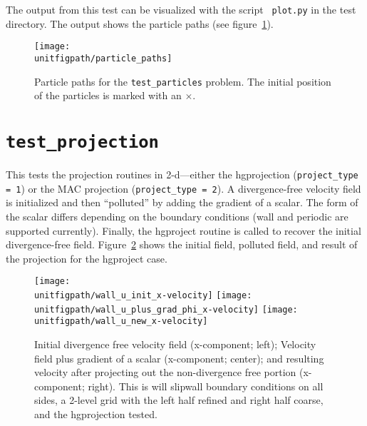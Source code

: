  The output from this test can be visualized with the script {\tt
  plot.py} in the test directory.  The output shows the particle
  paths (see figure~\ref{fig:unit:particles}).

\begin{figure}[t] 
\centering
\texttt{[image: \\unitfigpath/particle\_paths]} 
%
\caption[Particle paths for the {\tt test\_particles} problem]{\label{fig:unit:particles}
  Particle paths for the {\tt test\_particles} problem.  The initial
  position of the particles is marked with an $\times$.}
\end{figure}


\section {\tt test\_projection}

  This tests the projection routines in 2-d---either the hgprojection
  ({\tt project\_type = 1}) or the MAC projection ({\tt project\_type =
  2}).  A divergence-free velocity field is initialized and then
  ``polluted'' by adding the gradient of a scalar.  The form of the
  scalar differs depending on the boundary conditions (wall and
  periodic are supported currently).  Finally, the hgproject routine
  is called to recover the initial divergence-free field.
  Figure~\ref{fig:unit:projtest} shows the initial field, polluted
  field, and result of the projection for the hgproject case.

\begin{figure}[t] 
\centering
\texttt{[image: \\unitfigpath/wall\_u\_init\_x-velocity]} 
\texttt{[image: \\unitfigpath/wall\_u\_plus\_grad\_phi\_x-velocity]} 
\texttt{[image: \\unitfigpath/wall\_u\_new\_x-velocity]} 
%
\caption[Results of the {\tt test\_projection} unit test]{\label{fig:unit:projtest}
  Initial divergence free velocity field (x-component; left); Velocity field plus
  gradient of a scalar (x-component; center); and resulting velocity after projecting
  out the non-divergence free portion (x-component; right).  This is will slipwall
  boundary conditions on all sides, a 2-level grid with the left half refined and
  right half coarse, and the hgprojection tested.}
\end{figure}




